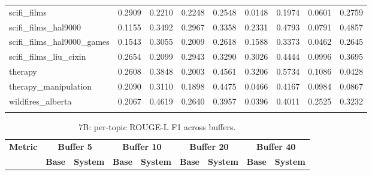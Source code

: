 \begin{landscape}
\begin{longtable}{@{}p{3.8cm}cccccccc@{}}
scifi\_films & 0.2909 & 0.2210 & 0.2248 & 0.2548 & 0.0148 & 0.1974 & 0.0601 & 0.2759 \\
scifi\_films\_hal9000 & 0.1155 & 0.3492 & 0.2967 & 0.3358 & 0.2331 & 0.4793 & 0.0791 & 0.4857 \\
scifi\_films\_hal9000\_games & 0.1543 & 0.3055 & 0.2009 & 0.2618 & 0.1588 & 0.3373 & 0.0462 & 0.2645 \\
scifi\_films\_liu\_cixin & 0.2654 & 0.2099 & 0.2943 & 0.3290 & 0.3026 & 0.4444 & 0.0996 & 0.3695 \\
therapy & 0.2608 & 0.3848 & 0.2003 & 0.4561 & 0.3206 & 0.5734 & 0.1086 & 0.0428 \\
therapy\_manipulation & 0.2090 & 0.3110 & 0.1898 & 0.4475 & 0.0466 & 0.4167 & 0.0984 & 0.0867 \\
wildfires\_alberta & 0.2067 & 0.4619 & 0.2640 & 0.3957 & 0.0396 & 0.4011 & 0.2525 & 0.3232 \\
\botrule
\end{longtable}
\begin{longtable}{@{}p{3.8cm}cccccccc@{}}
\caption{7B: per-topic ROUGE-L F1 across buffers.}\label{tab:app_7b_rougel_topics}\\

\toprule
\textbf{Metric} & \multicolumn{2}{c}{\textbf{Buffer 5}} & \multicolumn{2}{c}{\textbf{Buffer 10}} & \multicolumn{2}{c}{\textbf{Buffer 20}} & \multicolumn{2}{c}{\textbf{Buffer 40}} \\
\cmidrule(lr){2-3}\cmidrule(lr){4-5}\cmidrule(lr){6-7}\cmidrule(lr){8-9}
 & \textbf{Base} & \textbf{System} & \textbf{Base} & \textbf{System} & \textbf{Base} & \textbf{System} & \textbf{Base} & \textbf{System} \\
\midrule
\endfirsthead


\end{longtable}
\end{landscape}
